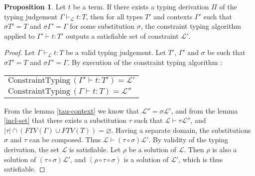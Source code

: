 \documentclass[10pt]{article}
\theoremstyle{plain}
\theoremstyle{definition}
\newtheorem{prop}{Proposition}[section]
\begin{document}
\begin{prop} Let $t$ be a term. If there exists a typing derivation $\Pi$ of the typing judgement
	$\Gamma \vdash_\mathcal{L} t : T$, then for all types $T'$ and contexts $\Gamma'$ such that $\sigma T' = T$ and $\sigma \Gamma' = \Gamma$
	for some substitution $\sigma$, the constraint typing algorithm applied to $\Gamma' \vdash t : T'$ outputs a satisfiable set of
	constraint $\mathcal{L'}$.
	
	\begin{proof}
		Let $\Gamma \vdash_\mathcal{L} t : T$ be a valid typing judgement. Let $T'$, $\Gamma'$ and $\sigma$ be such that
		$\sigma T' = T$ and $\sigma \Gamma' = \Gamma$. By execution of the constraint typing algorithm :
			\begin{center}
			\begin{tabular}{l}
				$\text{ConstraintTyping} \, (\Gamma' \vdash t : T') = \mathcal{L'}$ \\
				$\text{ConstraintTyping} \, (\Gamma \vdash t : T) = \mathcal{L''}$
			\end{tabular}
			\end{center}
		From the lemma \ref{tau-context} we know that $\mathcal{L''} = \sigma \mathcal{L'}$, and from the lemma \ref{incl-set} that
		there exists a substitution $\tau$ such that $\mathcal{L} \vdash \tau \mathcal{L''}$, and
		$|\tau| \cap (FTV(\Gamma) \cup FTV(T)) = \varnothing$. Having a separate domain, the substitutions $\sigma$ and $\tau$ can be composed.
		Thus $\mathcal{L} \vdash (\tau \circ \sigma) \mathcal{L'}$.
		By validity of the typing derivation, the set $\mathcal{L}$ is satisfiable.
		Let $\rho$ be a solution of $\mathcal{L}$. Then $\rho$ is also a solution of $(\tau \circ \sigma) \mathcal{L'}$, and
		$(\rho \circ \tau \circ \sigma)$ is a solution of $\mathcal{L'}$, which is thus satisfiable.
	\end{proof}
\end{prop}
\end{document}
